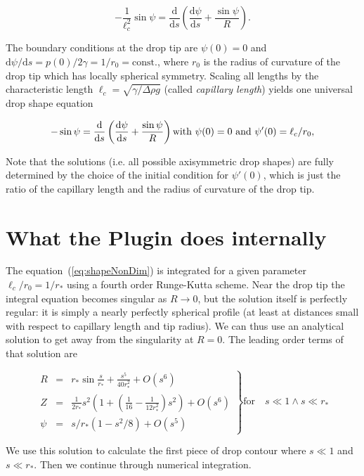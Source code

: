 \documentclass[fleqn]{scrartcl}
\newcommand{\ud}{\mathrm{d}}%
\begin{document}
\[\label{eq:shape}
  - \frac{1}{\ell_c^2} \sin\psi =
  \frac{\ud}{\ud s}\left( \frac{\ud\psi}{\ud s} + \frac{\sin\psi}{R} \right).
\]

 The boundary conditions at the drop tip are $\psi(0)=0$ and $\ud\psi
/ \ud s = p(0)/2\gamma = 1/r_0 = \mathrm{const.}$, where $r_0$ is the
radius of curvature of the drop tip which has locally spherical
symmetry. Scaling all lengths by the characteristic length $\ell_c =
\sqrt{\gamma/\Delta\!\rho g}$ (called \emph{capillary length}) yields
one universal drop shape equation

\begin{equation}\label{eq:shapeNonDim}
  - \sin\psi =
  \frac{\ud}{\ud s}\left( \frac{\ud\psi}{\ud s} + \frac{\sin\psi}{R} \right)\\
  \mbox{with } \psi(0)=0 \mbox{ and } \psi'(0) = \ell_c/r_0,
\end{equation}

Note that the solutions (i.e. all possible axisymmetric drop shapes)
are fully determined by the choice of the initial condition for
$\psi'(0)$, which is just the ratio of the capillary length and the
radius of curvature of the drop tip.

\section{What the Plugin does internally}
\label{sec:numerics}

The equation~(\ref{eq:shapeNonDim}) is integrated for a given parameter
$\ell_c/r_0 = 1/r_*$ using a fourth order Runge-Kutta scheme. Near the
drop tip the integral equation becomes singular as $R\to 0$, but the
solution itself is perfectly regular: it is simply a nearly perfectly
spherical profile (at least at distances small with respect to
capillary length and tip radius). We can thus use an analytical
solution to get away from the singularity at $R=0$. The leading order
terms of that solution are

\[
\left.%
\begin{array}{lll}
R & = & r_*\sin\frac{s}{r_*} + \frac{s^5}{40 r_*^2} + O(s^6) \\
Z & = & \frac{1}{2r_*} s^2 (1 + (\frac{1}{16} - \frac{1}{12r_*^2}) s^2) + O(s^6)\\
\psi & = & s/r_* (1-s^2/8) + O(s^5)
\end{array}\right\}
\mathrm{for}\quad s \ll 1 \wedge s \ll r_*
\]

We use this solution to calculate the first piece of drop contour
where $s \ll 1$ and $s \ll r_*$. Then we continue through numerical
integration.
\end{document}

